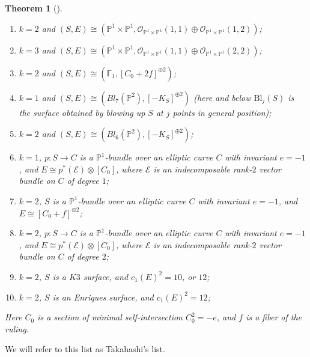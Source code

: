 \documentclass[a4paper]{amsart}
\theoremstyle{plain}
\newtheorem*{theorem*}{Theorem}
\theoremstyle{definition}
\begin{document}
\begin{theorem*}[\cite{Takahashi}]
\begin{enumerate}
            \item $k = 2$ and $(S, E) \cong (\mathbb P^1 \times \mathbb P^1, \mathcal O_{\mathbb P^1 \times \mathbb P^1}(1,1)\oplus  \mathcal O_{\mathbb P^1 \times \mathbb P^1}(1,2))$;
            \item $k = 3$ and $(S, E) \cong (\mathbb P^1 \times \mathbb P^1, \mathcal O_{\mathbb P^1 \times \mathbb P^1}(1,1)\oplus  \mathcal O_{\mathbb P^1 \times \mathbb P^1}(2,2))$;
            \item $k = 2$ and $(S, E) \cong (\mathbb F_1, [C_0 + 2f]^{\oplus 2})$;
            \item $k = 1$ and $(S, E) \cong (Bl_7(\mathbb P^2), [-K_S]^{\oplus 2})$ (here and below $\mathrm{Bl}_j(S)$ is the surface obtained by blowing up $S$ at $j$
            points in general position);
            \item $k = 2$ and $(S, E) \cong (Bl_6(\mathbb P^2), [-K_S]^{\oplus 2})$;
            \item $k = 1$, $p \colon S \to C$ is a $\mathbb P^1$-bundle over an elliptic curve $C$ with invariant $e = -1$, and $E \cong p^*(\mathcal E)\otimes [C_0]$, where $\mathcal E$ is an indecomposable rank-$2$ vector bundle on $C$ of degree $1$;
            \item $k = 2$, $S$ is a $\mathbb P^1$-bundle over an elliptic curve $C$ with invariant $e = -1$, and $E \cong [C_0 + f]^{\oplus 2}$;
            \item $k = 2$, $p \colon S \to C$ is a $\mathbb P^1$-bundle over an elliptic curve $C$ with invariant $e = -1$, and $E \cong p^*(\mathcal E)\otimes [C_0]$, where $\mathcal E$ is an indecomposable rank-$2$ vector bundle on $C$ of degree $2$;
            \item $k = 2$, $S$ is a $K3$ surface, and $c_1(E)^2 = 10$, or $12$;
            \item $k = 2$, $S$ is an Enriques surface, and $c_1(E)^2 = 12$;
        \end{enumerate}
    Here $C_0$ is a section of minimal self-intersection $C_0^2 = -e$, and $f$ is a fiber of the ruling.
\end{theorem*}
We will refer to this list as Takahashi's list.
\end{document}
